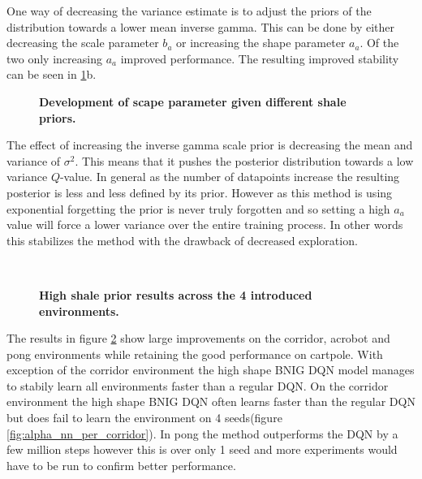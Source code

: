 One way of decreasing the variance estimate is to adjust the priors of the distribution towards a lower mean inverse gamma. This can be done by either decreasing the scale parameter $b_a$ or increasing the shape parameter $a_a$. Of the two only increasing $a_a$ improved performance. The resulting improved stability can be seen in \ref{fig:scale_stability}b.

\begin{figure}[H]
    \centering
    \caption{\textbf{Development of scape parameter given different shale priors.}}
    \label{fig:scale_stability}
\end{figure}

The effect of increasing the inverse gamma scale prior is decreasing the mean and variance of $\sigma^2$. This means that it pushes the posterior distribution towards a low variance $Q$-value. In general as the number of datapoints increase the resulting posterior is less and less defined by its prior. However as this method is using exponential forgetting the prior is never truly forgotten and so setting a high $a_a$ value will force a lower variance over the entire training process. In other words this stabilizes the method with the drawback of decreased exploration.

\begin{figure}[H] 
    \centering 
    \\
    \caption{\textbf{High shale prior results across the 4 introduced environments.}} 
    \label{fig:high_scale} 
\end{figure}

The results in figure \ref{fig:high_scale} show large improvements on the corridor, acrobot and pong environments while retaining the good performance on cartpole. With exception of the corridor environment the high shape BNIG DQN model manages to stabily learn all environments faster than a regular DQN. On the corridor environment the high shape BNIG DQN often learns faster than the regular DQN but does fail to learn the environment on 4 seeds(figure \ref{fig:alpha_nn_per_corridor}). In pong the method outperforms the DQN by a few million steps however this is over only 1 seed and more experiments would have to be run to confirm better performance.

